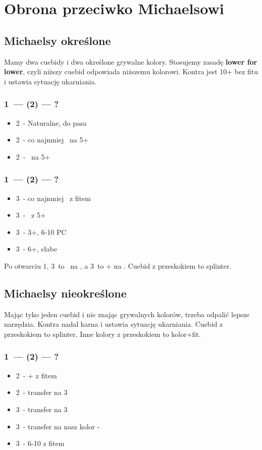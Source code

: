 \documentclass[12pt, a4paper]{article}
\begin{document}
\section{Obrona przeciwko Michaelsowi}

\subsection{Michaelsy określone}
Mamy dwa cuebidy i dwa określone grywalne kolory. Stosujemy zasadę \textbf{lower for lower},
czyli niższy cuebid odpowiada niższemu kolorowi. Kontra jest 10+ bez fitu i ustawia sytuację ukarniania.

\subsubsection{1\clubs\ --- (2\clubs) --- ?}
\begin{itemize}
    \item 2\diams\ - Naturalne, do pasa
    \item 2\hearts\ - co najmniej \inv\ na 5+\clubs
    \item 2\spades\ - \gf\ na 5+\diams
\end{itemize}

\subsubsection{1\hearts\ --- (2\ntx) --- ?}
\begin{itemize}
    \item 3\clubs\ - co najmniej \inv\ z fitem \hearts
    \item 3\diams\ - \gf\ z 5+\spades
    \item 3\hearts\ - 3+\hearts, 6-10 PC
    \item 3\spades\ - 6+\spades, słabe
\end{itemize}
Po otwarciu 1\spades, 3\clubs\ to \gf\ na \hearts, a 3\diams\ to \inv+ na \spades.
Cuebid z przeskokiem to splinter.

\subsection{Michaelsy nieokreślone}
Mając tyko jeden cuebid i nie znając grywalnych kolorów, trzeba odpalić lepsze narzędzia.
Kontra nadal karna i ustawia sytuację ukarniania.
Cuebid z przeskokiem to splinter.
Inne kolory z przeskokiem to kolor+fit.
\subsubsection{1\hearts\ --- (2\hearts) --- ?}
\begin{itemize}
    \item 2\spades\ - \inv+ z fitem \hearts
    \item 2\nt\ - transfer na 3\clubs
    \item 3\clubs\ - transfer na 3\diams
    \item 3\diams\ - transfer na nasz kolor - \mixed
    \item 3\hearts\ - 6-10 z fitem \hearts
\end{itemize}
\end{document}
